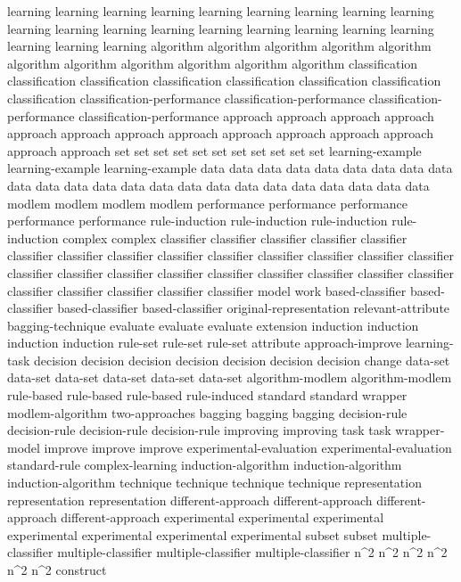 learning	learning	learning	learning	learning	learning	learning	learning	learning	learning	learning	learning	learning	learning	learning	learning	learning	learning	learning	learning	learning	
algorithm	algorithm	algorithm	algorithm	algorithm	algorithm	algorithm	algorithm	algorithm	algorithm	algorithm	
classification	classification	classification	classification	classification	classification	classification	classification	
classification-performance	classification-performance	classification-performance	classification-performance	
approach	approach	approach	approach	approach	approach	approach	approach	approach	approach	approach	approach	approach	approach	
set	set	set	set	set	set	set	set	set	set	set	
learning-example	learning-example	learning-example	
data	data	data	data	data	data	data	data	data	data	data	data	data	data	data	data	data	data	data	data	data	data	data	data	
modlem	modlem	modlem	modlem	
performance	performance	performance	performance	performance	
rule-induction	rule-induction	rule-induction	rule-induction	
complex	complex	
classifier	classifier	classifier	classifier	classifier	classifier	classifier	classifier	classifier	classifier	classifier	classifier	classifier	classifier	classifier	classifier	classifier	classifier	classifier	classifier	classifier	classifier	classifier	classifier	classifier	classifier	classifier	classifier	
model	
work	
based-classifier	based-classifier	based-classifier	based-classifier	
original-representation	
relevant-attribute	
bagging-technique	
evaluate	evaluate	evaluate	
extension	
induction	induction	induction	induction	
rule-set	rule-set	rule-set	
attribute	
approach-improve	
learning-task	
decision	decision	decision	decision	decision	decision	decision	
change	
data-set	data-set	data-set	data-set	data-set	data-set	
algorithm-modlem	algorithm-modlem	
rule-based	rule-based	rule-based	
rule-induced	
standard	standard	
wrapper	
modlem-algorithm	
two-approaches	
bagging	bagging	bagging	
decision-rule	decision-rule	decision-rule	decision-rule	
improving	improving	
task	task	
wrapper-model	
improve	improve	improve	
experimental-evaluation	experimental-evaluation	
standard-rule	
complex-learning	
induction-algorithm	induction-algorithm	induction-algorithm	
technique	technique	technique	technique	
representation	representation	representation	
different-approach	different-approach	different-approach	different-approach	
experimental	experimental	experimental	experimental	experimental	experimental	experimental	
subset	subset	
multiple-classifier	multiple-classifier	multiple-classifier	multiple-classifier	
n^2	n^2	n^2	n^2	n^2	n^2	
construct	
